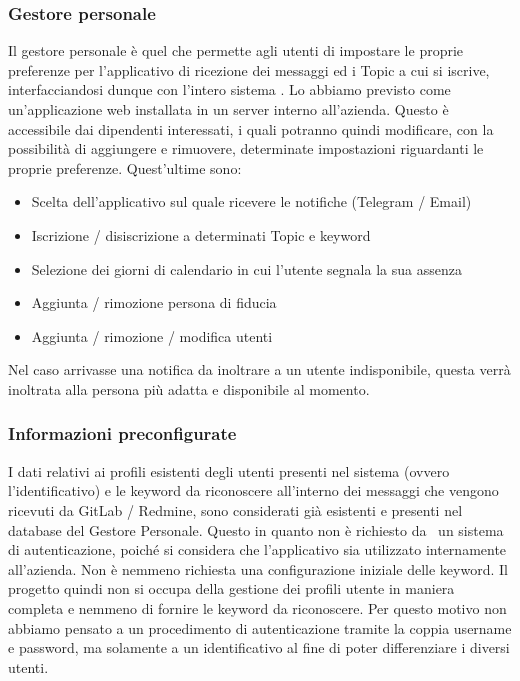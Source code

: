 	\subsubsection{Gestore personale}\label{TecnologieGestorePersonale}
	Il gestore personale è quel  che permette agli utenti di impostare le proprie preferenze per l'applicativo di ricezione dei messaggi ed i Topic a cui si iscrive, interfacciandosi dunque con l'intero sistema \progetto.
	Lo abbiamo previsto come un'applicazione web installata in un server interno all'azienda.
	Questo è accessibile dai dipendenti interessati, i quali potranno quindi modificare, con la possibilità di aggiungere e rimuovere, determinate impostazioni riguardanti le proprie preferenze.
	Quest'ultime sono:
	\begin{itemize}
		\item Scelta dell'applicativo sul quale ricevere le notifiche (Telegram / Email)
		\item Iscrizione / disiscrizione a determinati Topic e keyword
		\item Selezione dei giorni di calendario in cui l'utente segnala la sua assenza
		\item Aggiunta / rimozione persona di fiducia
		\item Aggiunta / rimozione / modifica utenti
	\end{itemize}
	Nel caso arrivasse una notifica da inoltrare a un utente indisponibile, questa verrà inoltrata alla persona più adatta e disponibile al momento.

	\subsubsection{Informazioni preconfigurate}
	I dati relativi ai profili esistenti degli utenti presenti nel sistema (ovvero l'identificativo) e le keyword da riconoscere all'interno dei messaggi che vengono ricevuti da GitLab / Redmine, sono considerati già esistenti e presenti nel database del Gestore Personale.
	Questo in quanto non è richiesto da \II\ un sistema di autenticazione, poiché si considera che l'applicativo sia utilizzato internamente all'azienda.
	Non è nemmeno richiesta una configurazione iniziale delle keyword.
	Il progetto quindi non si occupa della gestione dei profili utente in maniera completa e nemmeno di fornire le keyword da riconoscere.
	Per questo motivo non abbiamo pensato a un procedimento di autenticazione tramite la coppia username e password, ma solamente a un identificativo al fine di poter differenziare i diversi utenti.